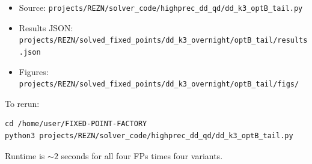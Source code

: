 \documentclass[11pt]{article}
\begin{document}
\begin{itemize}
  \item Source: \texttt{projects/REZN/solver\_code/highprec\_dd\_qd/dd\_k3\_optB\_tail.py}
  \item Results JSON: \texttt{projects/REZN/solved\_fixed\_points/dd\_k3\_overnight/optB\_tail/results.json}
  \item Figures: \texttt{projects/REZN/solved\_fixed\_points/dd\_k3\_overnight/optB\_tail/figs/}
\end{itemize}

To rerun:
\begin{verbatim}
cd /home/user/FIXED-POINT-FACTORY
python3 projects/REZN/solver_code/highprec_dd_qd/dd_k3_optB_tail.py
\end{verbatim}
Runtime is ${\sim}2$ seconds for all four FPs times four variants.
\end{document}

